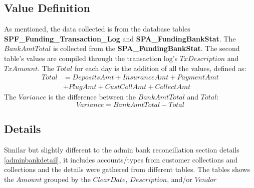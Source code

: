 \documentclass[titlepage]{article}
\begin{document}
\newpage
\subsection{Value Definition}
As mentioned, the data collected is from the database tables \textbf{SPF\_Funding\_Transaction\_Log} and \textbf{SPA\_FundingBankStat}. The $BankAmtTotal$ is collected from the \textbf{SPA\_FundingBankStat}. The second table's values are compiled through the transaction log's $TxDescription$ and $TxAmount$. The $Total$ for each day is the addition of all the values, defined as:
\begin{equation}
\begin{split}
Total &= DepositsAmt + InsuranceAmt + PaymentAmt \\
&+ PlugAmt + CustCollAmt + CollectAmt
\end{split}
\end{equation}The $Variance$ is the difference between the $BankAmtTotal$ and $Total$:
\begin{equation}
Variance = BankAmtTotal - Total
\end{equation}

\subsection{Details}
Similar but slightly different to the admin bank reconcillation section details \ref{adminbankdetail}, it includes accounts/types from customer collections and collections and the details were gathered from different tables. The tables shows the $Amount$ grouped by the $ClearDate$, $Description$, and/or $Vendor$
\end{document}
